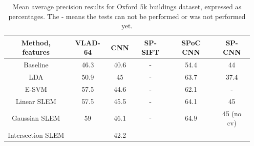 \begin{table}[t]
\begin{center}
\begin{tabular}{|c|c|c|c|c|c|}
\hline
Method, features & VLAD-64 \cite{VLAD}& CNN \cite{jia2014caffe} & SP-SIFT \cite{spk} & SPoC CNN \cite{babenko15} &  SP-CNN \cite{SPPCNN} \\
\hline\hline
Baseline            & 46.3 & 40.6 & - & 54.4 & 44 \\
LDA                 & 50.9 & 45   & - & 63.7 & 37.4\\
E-SVM               & 57.5 & 44.6 & - & 62.1 & - \\
Linear SLEM         & 57.5 & 45.5 & - & 64.1 & 45 \\
Gaussian SLEM       & 59   & 46.1 & - & 64.9 & 45 (no cv) \\
Intersection SLEM   & -    & 42.2 & - & -    & - \\
\hline
\end{tabular}
\end{center}
\caption{Mean average precision results for Oxford 5k buildings dataset, expressed as percentages. The - means the tests can not be performed or was not performed yet.}
\end{table}


